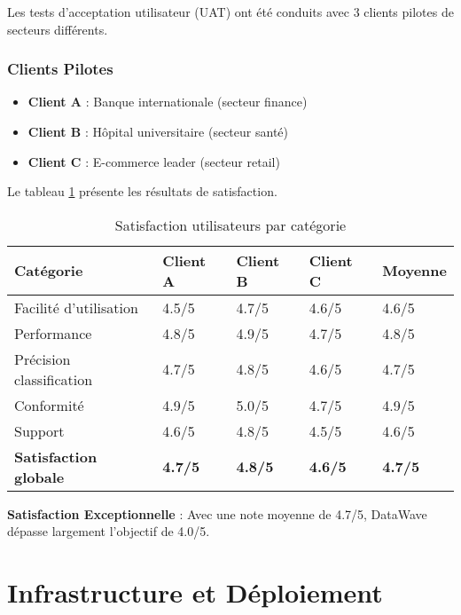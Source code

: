 Les tests d'acceptation utilisateur (UAT) ont été conduits avec 3 clients pilotes de secteurs différents.

\subsubsection{Clients Pilotes}

\begin{itemize}
    \item \textbf{Client A} : Banque internationale (secteur finance)
    \item \textbf{Client B} : Hôpital universitaire (secteur santé)
    \item \textbf{Client C} : E-commerce leader (secteur retail)
\end{itemize}

Le tableau \ref{tab:satisfaction_utilisateurs} présente les résultats de satisfaction.

\begin{table}[htpb]
\centering
\caption{Satisfaction utilisateurs par catégorie}
\label{tab:satisfaction_utilisateurs}
\begin{tabular}{|p{}|p{}|p{}|p{}|p{}|}
\hline
\textbf{Catégorie} & \textbf{Client A} & \textbf{Client B} & \textbf{Client C} & \textbf{Moyenne} \\
\hline
Facilité d'utilisation & 4.5/5 & 4.7/5 & 4.6/5 & 4.6/5 \\
\hline
Performance & 4.8/5 & 4.9/5 & 4.7/5 & 4.8/5 \\
\hline
Précision classification & 4.7/5 & 4.8/5 & 4.6/5 & 4.7/5 \\
\hline
Conformité & 4.9/5 & 5.0/5 & 4.7/5 & 4.9/5 \\
\hline
Support & 4.6/5 & 4.8/5 & 4.5/5 & 4.6/5 \\
\hline
\textbf{Satisfaction globale} & \textbf{4.7/5} & \textbf{4.8/5} & \textbf{4.6/5} & \textbf{4.7/5} \\
\hline
\end{tabular}
\end{table}

\textbf{Satisfaction Exceptionnelle} : Avec une note moyenne de 4.7/5, DataWave dépasse largement l'objectif de 4.0/5.

\section{Infrastructure et Déploiement}

